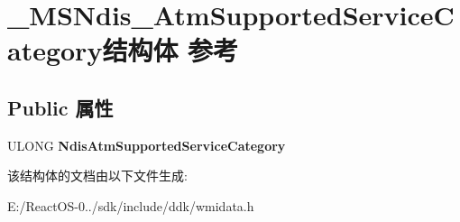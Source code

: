 \hypertarget{struct___m_s_ndis___atm_supported_service_category}{}\section{\+\_\+\+M\+S\+Ndis\+\_\+\+Atm\+Supported\+Service\+Category结构体 参考}
\label{struct___m_s_ndis___atm_supported_service_category}
\subsection*{Public 属性}
\begin{DoxyCompactItemize}
\item 
\mbox{\label{struct___m_s_ndis___atm_supported_service_category_a7aa81305c55508af7e2af16a9d2cc118}} 
U\+L\+O\+NG {\bfseries Ndis\+Atm\+Supported\+Service\+Category}
\end{DoxyCompactItemize}


该结构体的文档由以下文件生成\+:\begin{DoxyCompactItemize}
\item 
E\+:/\+React\+O\+S-\/0../sdk/include/ddk/wmidata.\+h\end{DoxyCompactItemize}

